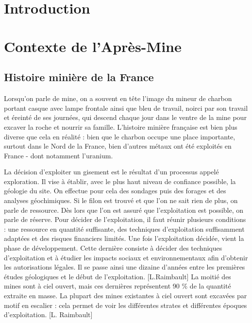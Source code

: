 \documentclass{article}
\begin{document}
\newpage
{}
\section*{Introduction}

\newpage
\section{Contexte de l’Après-Mine}

\subsection{Histoire minière de la France}

\paragraph{} Lorsqu’on parle de mine, on a souvent en tête l’image du mineur de charbon portant casque avec lampe frontale ainsi que bleu de travail, noirci par son travail et éreinté de ses journées, qui descend chaque jour dans le ventre de la mine pour excaver la roche et nourrir sa famille. L’histoire minière française est bien plus diverse que cela en réalité : bien que le charbon occupe une place importante, surtout dans le Nord de la France, bien d’autres métaux ont été exploités en France - dont notamment l’uranium.

La décision d’exploiter un gisement est le résultat d’un processus appelé exploration. Il vise à établir, avec le plus haut niveau de confiance possible, la géologie du site. On effectue pour cela des sondages puis des forages et des analyses géochimiques. Si le filon est trouvé et que l’on ne sait rien de plus, on parle de ressource. Dès lors que l’on est assuré que l’exploitation est possible, on parle de réserve. Pour décider de l’exploitation, il faut réunir plusieurs conditions : une ressource en quantité suffisante, des techniques d’exploitation suffisamment adaptées et des risques financiers limités. Une fois l’exploitation décidée, vient la phase de développement. Cette dernière consiste à décider des techniques d’exploitation et à étudier les impacts sociaux et environnementaux afin d’obtenir les autorisations légales. Il se passe ainsi une dizaine d’années entre les premières études géologiques et le début de l’exploitation. [L.Raimbault]
La moitié des mines sont à ciel ouvert, mais ces dernières représentent 90 \% de la quantité extraite en masse. La plupart des mines existantes à ciel ouvert sont excavées par motif en escalier : cela permet de voir les différentes strates et différentes époques d’exploitation. [L. Raimbault]
\end{document}
